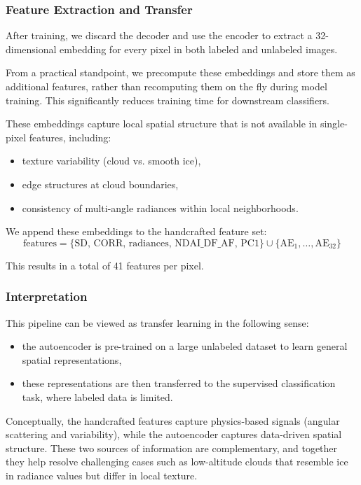\documentclass[10pt,letterpaper]{article}
\begin{document}
\subsubsection*{Feature Extraction and Transfer}

After training, we discard the decoder and use the encoder to extract a 32-dimensional embedding for every pixel in both labeled and unlabeled images.

From a practical standpoint, we precompute these embeddings and store them as additional features, rather than recomputing them on the fly during model training. This significantly reduces training time for downstream classifiers.

These embeddings capture local spatial structure that is not available in single-pixel features, including:
\begin{itemize}
    \item texture variability (cloud vs. smooth ice),
    \item edge structures at cloud boundaries,
    \item consistency of multi-angle radiances within local neighborhoods.
\end{itemize}

We append these embeddings to the handcrafted feature set:
\[
\text{features} = \{\text{SD, CORR, radiances, NDAI\_DF\_AF, PC1}\} \cup \{\text{AE}_1, \dots, \text{AE}_{32}\}
\]

This results in a total of 41 features per pixel.

\subsubsection*{Interpretation}

This pipeline can be viewed as transfer learning in the following sense:
\begin{itemize}
    \item the autoencoder is pre-trained on a large unlabeled dataset to learn general spatial representations,
    \item these representations are then transferred to the supervised classification task, where labeled data is limited.
\end{itemize}

Conceptually, the handcrafted features capture physics-based signals (angular scattering and variability), while the autoencoder captures data-driven spatial structure. These two sources of information are complementary, and together they help resolve challenging cases such as low-altitude clouds that resemble ice in radiance values but differ in local texture.
\end{document}

